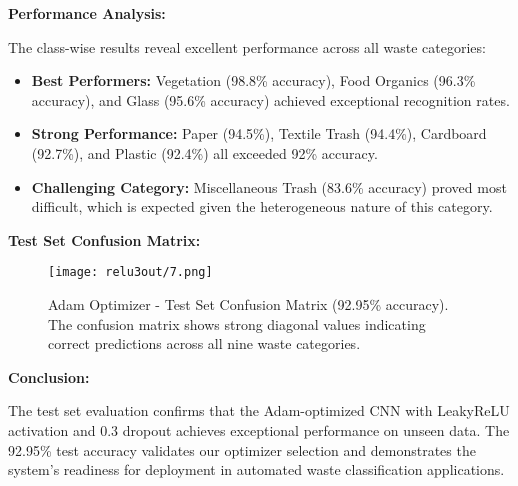 \documentclass[12pt,a4paper]{article}
\begin{document}
\textbf{Performance Analysis:}

The class-wise results reveal excellent performance across all waste categories:

\begin{itemize}
    \item \textbf{Best Performers:} Vegetation (98.8\% accuracy), Food Organics (96.3\% accuracy), and Glass (95.6\% accuracy) achieved exceptional recognition rates.
    
    \item \textbf{Strong Performance:} Paper (94.5\%), Textile Trash (94.4\%), Cardboard (92.7\%), and Plastic (92.4\%) all exceeded 92\% accuracy.
    
    \item \textbf{Challenging Category:} Miscellaneous Trash (83.6\% accuracy) proved most difficult, which is expected given the heterogeneous nature of this category.
\end{itemize}

\textbf{Test Set Confusion Matrix:}

\begin{figure}[H]
\centering
\texttt{[image: relu3out/7.png]}
\caption{Adam Optimizer - Test Set Confusion Matrix (92.95\% accuracy). The confusion matrix shows strong diagonal values indicating correct predictions across all nine waste categories.}
\label{fig:adam_confmat_test}
\end{figure}

\textbf{Conclusion:}

The test set evaluation confirms that the Adam-optimized CNN with LeakyReLU activation and 0.3 dropout achieves exceptional performance on unseen data. The 92.95\% test accuracy validates our optimizer selection and demonstrates the system's readiness for deployment in automated waste classification applications.
\end{document}
